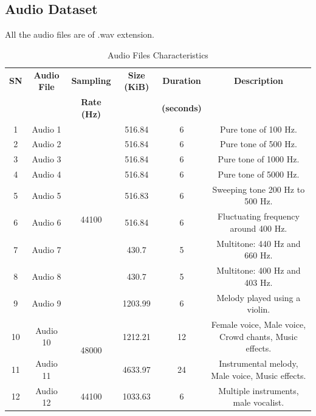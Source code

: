 \documentclass{ioereport}
\begin{document}
\subsection{Audio Dataset}
All the audio files are of .wav extension.
\begin{table}[H]
    \centering
    \caption{Audio Files Characteristics}
    \label{tab:audio_files}
    \begin{tabular}{|c|c|c|c|c|c|}
        \hline
        \textbf{SN} & \textbf{Audio File} & \textbf{Sampling} & \textbf{Size (KiB)} & \textbf{Duration} & \textbf{Description}\\
        &  & \textbf{Rate (Hz)} &  & \textbf{(seconds)} & \\
        \hline
        1 & Audio 1 & \multirow{9}{*}{44100} & 516.84 & 6 & Pure tone of 100 Hz.\\
        \cline{1-2} \cline{4-6}
        2 & Audio 2 & & 516.84 & 6 & Pure tone of 500 Hz.\\
        \cline{1-2} \cline{4-6}
        3 & Audio 3 & & 516.84 & 6 & Pure tone of 1000 Hz.\\
        \cline{1-2} \cline{4-6}
        4 & Audio 4 & & 516.84 & 6 & Pure tone of 5000 Hz.\\
        \cline{1-2} \cline{4-6}
        5 & Audio 5 & & 516.83 & 6 & Sweeping tone 200 Hz to 500 Hz.\\
        \cline{1-2} \cline{4-6}
        6 & Audio 6 & & 516.84 & 6 & Fluctuating frequency around 400 Hz.\\
        \cline{1-2} \cline{4-6}
        7 & Audio 7 & & 430.7 & 5 & Multitone: 440 Hz and 660 Hz.\\
        \cline{1-2} \cline{4-6}
        8 & Audio 8 & & 430.7 & 5 & Multitone: 400 Hz and 403 Hz.\\
        \cline{1-2} \cline{4-6}
        9 & Audio 9 & & 1203.99 & 6 & Melody played using a violin.\\
        \hline
        10 & Audio 10 & \multirow{2}{*}{48000} & 1212.21 & 12 & Female voice, Male voice, Crowd chants, Music effects.\\
        \cline{1-2} \cline{4-6}
        11 & Audio 11 & & 4633.97 & 24 & Instrumental melody, Male voice, Music effects. \\
        \hline
        12 & Audio 12 & 44100 & 1033.63 & 6 & Multiple instruments, male vocalist.\\
        \hline
    \end{tabular}
    \end{table}    
\end{document}
